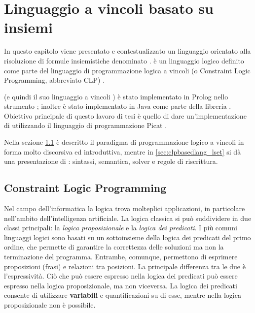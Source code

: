 \documentclass[12pt,a4paper,openright]{book} %
\begin{document}
\thispagestyle{fancy}
\renewcommand{\headrulewidth}{0pt}
\lhead{\thepage}
\cfoot{}



\chapter{Linguaggio a vincoli basato su insiemi}
\label{ch:clpbasedlang}


In questo capitolo viene presentato e contestualizzato un linguaggio
orientato alla risoluzione di formule insiemistiche denominato
\lset{}. \lset{} è un linguaggio logico definito come parte del
linguaggio di programmazione logica a vincoli (o Constraint Logic
Programming, abbreviato CLP) \clpset{} \cite{Dovier00}.

\clpset{} (e quindi il suo linguaggio a vincoli \lset{}) è stato
implementato in Prolog nello strumento \setlog{} \cite{SetLog};
inoltre \lset{} è stato implementato in Java come parte della libreria
\jsetl{} \cite{JSetL}. Obiettivo principale di questo lavoro di tesi è
quello di dare un’implementazione di \lset{} utilizzando il linguaggio
di programmazione Picat \cite{PicatLang}.

Nella sezione \ref{sec:clpbasedlang_clp} è descritto il paradigma di
programmazione logico a vincoli in forma molto discorsiva ed
introduttiva, mentre in \ref{sec:clpbasedlang_lset} si dà una
presentazione di \lset{}: sintassi, semantica, solver e regole di
riscrittura.

\section{Constraint Logic Programming}
\label{sec:clpbasedlang_clp}

Nel campo dell'informatica la logica trova molteplici applicazioni, in
particolare nell'ambito dell'intelligenza artificiale. La logica
classica si può suddividere in due classi principali: la \emph{logica
  proposizionale} e la \emph{logica dei predicati}.  I più comuni
linguaggi logici sono basati su un sottoinsieme della logica dei
predicati del primo ordine, che permette di garantire la correttezza
delle soluzioni ma non la terminazione del programma. Entrambe,
comunque, permettono di esprimere proposizioni (frasi) e relazioni tra
posizioni. La principale differenza tra le due è l'espressività. Ciò
che può essere espresso nella logica dei predicati può essere espresso
nella logica proposizionale, ma non viceversa. La logica dei predicati
consente di utilizzare \textbf{variabili} e quantificazioni su di
esse, mentre nella logica proposizionale non è possibile.
\end{document}
